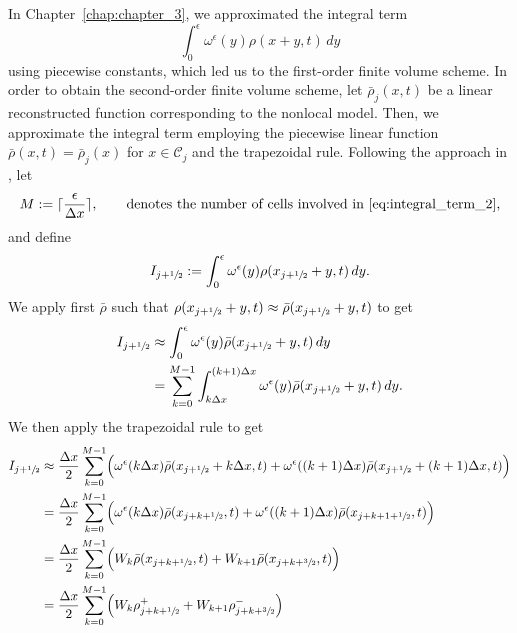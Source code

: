 In Chapter~\ref{chap:chapter_3}, we approximated the integral term
\begin{equation}\label{eq:integral_term_2}
    \int_{0}^{\epsilon} \omega^{\epsilon}(y) \rho(x+y,t) \, dy
\end{equation}
using piecewise constants, which led us to the first-order finite volume scheme. In order to obtain the second-order finite volume scheme, let $\bar{\rho}_j(x,t)$ be a linear reconstructed function corresponding to the nonlocal model. Then, we approximate the integral term employing the piecewise linear function $\bar{\rho}(x,t)= \bar{\rho}_j(x)$ for $x \in \mathcal{C}_j$ and the trapezoidal rule. Following the approach in \cite{gowdag.d.ConvergenceSecondorderScheme2023},
let
\[M:=\lceil \frac{\epsilon}{\Delta x}\rceil,\qquad \text{denotes the number of cells involved in \eqref{eq:integral_term_2}}, \]
and define
\[
    I_{j+\sfrac12}:= \int_{0}^{\epsilon} \omega^{\epsilon}(y) \rho(x_{j+\sfrac12}+y,t) \, dy.
\]
We apply first $\bar{\rho}$ such that $\rho(x_{j+\sfrac12}+y,t) \approx \bar{\rho}(x_{j+\sfrac12}+y,t)$ to get
\begin{align*}
    I_{j+\sfrac12} & \approx \int_{0}^{\epsilon} \omega^{\epsilon}(y) \bar{\rho}(x_{j+\sfrac12}+y,t) \, dy                         \\
                   & =\sum_{k=0}^{M-1} \int_{k\Delta x}^{(k+1)\Delta x} \omega^{\epsilon}(y) \bar{\rho}(x_{j+\sfrac12}+y,t) \, dy.
\end{align*}
We then apply the trapezoidal rule to get
\begin{align*}
    I_{j+\sfrac12} & \approx \frac{\Delta x}{2}\sum_{k=0}^{M-1} \Bigl(\omega^{\epsilon}(k\Delta x)\bar{\rho}(x_{j+\sfrac12}+k\Delta x,t) + \omega^{\epsilon}((k+1)\Delta x)\bar{\rho}(x_{j+\sfrac12}+(k+1)\Delta x,t)\Bigr) \\
                   & = \frac{\Delta x}{2} \sum_{k=0}^{M-1} \Bigl(\omega^{\epsilon}(k\Delta x)\bar{\rho}(x_{j+k+\sfrac12},t) + \omega^{\epsilon}((k+1)\Delta x)\bar{\rho}(x_{j+k+1+\sfrac12},t) \Bigr)                       \\
                   & = \frac{\Delta x}{2}\sum_{k=0}^{M-1} \Bigl(W_k \bar{\rho}(x_{j+k+\sfrac12},t) + W_{k+1}\bar{\rho}(x_{j+k+\sfrac32},t) \Bigr)                                                                           \\
                   & = \frac{\Delta x}{2}\sum_{k=0}^{M-1} \Bigl( W_k \rho_{j+k+\sfrac12}^+ + W_{k+1}\rho_{j+k+\sfrac32}^- \Bigr)                                                                                            \\
\end{align*}
